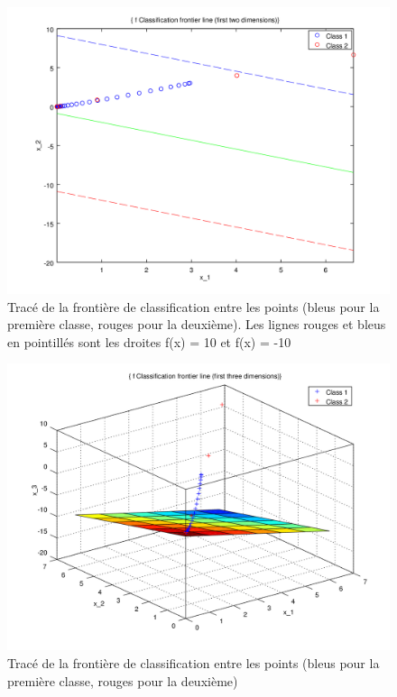 \documentclass{article}
\begin{document}
         \begin{figure}
           \begin{center}
             \includegraphics[scale=0.5]{images/line5.png}
             \caption{Tracé de la frontière de classification entre les points (bleus pour la première classe, rouges pour la deuxième). Les lignes rouges et bleus en pointillés sont les droites f(x) = 10 et f(x) = -10}
           \end{center}
         \end{figure}

         \begin{figure}
           \begin{center}
             \includegraphics[scale=0.5]{images/plane5.png}
             \caption{Tracé de la frontière de classification entre les points (bleus pour la première classe, rouges pour la deuxième)}
           \end{center}
         \end{figure}
\end{document}
